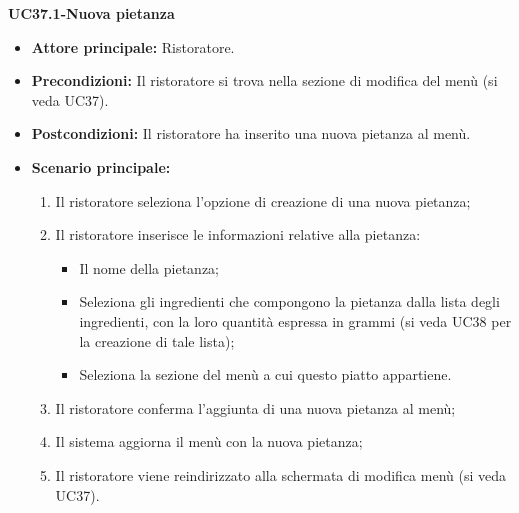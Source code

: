\textbf{UC37.1-Nuova pietanza}
\begin{itemize}
    \item \textbf{Attore principale:} Ristoratore.
    \item \textbf{Precondizioni:} Il ristoratore si trova nella sezione di modifica del menù (si veda UC37).
    \item \textbf{Postcondizioni:} Il ristoratore ha inserito una nuova pietanza al menù.
    \item \textbf{Scenario principale:}
    \begin{enumerate}
        \item Il ristoratore seleziona l'opzione di creazione di una nuova pietanza;
        \item Il ristoratore inserisce le informazioni relative alla pietanza:
        \begin{itemize}
            \item Il nome della pietanza;
            \item Seleziona gli ingredienti che compongono la pietanza dalla lista degli ingredienti, con la loro quantità espressa in grammi (si veda UC38 per la creazione di tale lista);
            \item Seleziona la sezione del menù a cui questo piatto appartiene.
        \end{itemize}
        \item Il ristoratore conferma l'aggiunta di una nuova pietanza al menù;
        \item Il sistema aggiorna il menù con la nuova pietanza;
        \item Il ristoratore viene reindirizzato alla schermata di modifica menù (si veda UC37).
    \end{enumerate}
\end{itemize}

